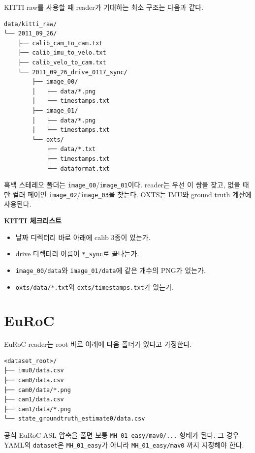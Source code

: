 \documentclass[11pt,a4paper,oneside]{report}
\begin{document}
KITTI raw를 사용할 때 reader가 기대하는 최소 구조는 다음과 같다.

\begin{lstlisting}[style=shell,caption={KITTI raw 권장 배치}]
data/kitti_raw/
└── 2011_09_26/
    ├── calib_cam_to_cam.txt
    ├── calib_imu_to_velo.txt
    ├── calib_velo_to_cam.txt
    └── 2011_09_26_drive_0117_sync/
        ├── image_00/
        │   ├── data/*.png
        │   └── timestamps.txt
        ├── image_01/
        │   ├── data/*.png
        │   └── timestamps.txt
        └── oxts/
            ├── data/*.txt
            ├── timestamps.txt
            └── dataformat.txt
\end{lstlisting}

흑백 스테레오 폴더는 \texttt{image\_00}/\texttt{image\_01}이다. reader는 우선 이 쌍을
찾고, 없을 때만 컬러 페어인 \texttt{image\_02}/\texttt{image\_03}을 찾는다. OXTS는
IMU와 ground truth 계산에 사용된다.

\begin{checkbox}
\textbf{KITTI 체크리스트}
\begin{itemize}[leftmargin=1.4em]
\item 날짜 디렉터리 바로 아래에 calib 3종이 있는가.
\item drive 디렉터리 이름이 \texttt{*\_sync}로 끝나는가.
\item \texttt{image\_00/data}와 \texttt{image\_01/data}에 같은 개수의 PNG가 있는가.
\item \texttt{oxts/data/*.txt}와 \texttt{oxts/timestamps.txt}가 있는가.
\end{itemize}
\end{checkbox}

\section{EuRoC}

EuRoC reader는 root 바로 아래에 다음 폴더가 있다고 가정한다.

\begin{lstlisting}[style=shell,caption={EuRoC reader가 기대하는 구조}]
<dataset_root>/
├── imu0/data.csv
├── cam0/data.csv
├── cam0/data/*.png
├── cam1/data.csv
├── cam1/data/*.png
└── state_groundtruth_estimate0/data.csv
\end{lstlisting}

공식 EuRoC ASL 압축을 풀면 보통 \texttt{MH\_01\_easy/mav0/...} 형태가 된다.
그 경우 YAML의 \texttt{dataset}은 \texttt{MH\_01\_easy}가 아니라 \texttt{MH\_01\_easy/mav0}
까지 지정해야 한다.
\end{document}
